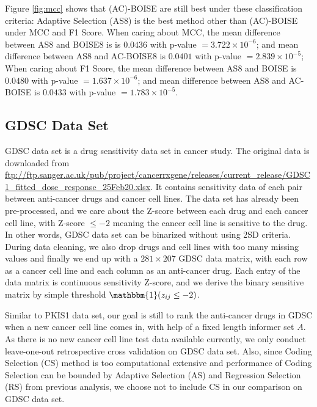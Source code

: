 \documentclass[12pt]{article}
\begin{document}
Figure \ref{fig:mcc} shows that (AC)-BOISE are still best under these classification criteria: Adaptive Selection (AS8) is the best method other than (AC)-BOISE  under MCC and F1 Score. When caring about MCC, the mean difference between AS8 and BOISE8 is is $0.0436$ with p-value $=3.722\times 10^{-6}$; and  mean difference between AS8 and AC-BOISE8 is $0.0401$ with p-value $=2.839\times 10^{-5}$; When caring about F1 Score, the mean difference between AS8 and BOISE is $0.0480$ with p-value $=1.637\times 10^{-6}$; and  mean difference between AS8 and AC-BOISE is $0.0433$ with p-value $=1.783\times 10^{-5}$.


\subsection{GDSC Data Set}
GDSC data set is a drug sensitivity data set in cancer study. The original data is downloaded from \url{ftp://ftp.sanger.ac.uk/pub/project/cancerrxgene/releases/current_release/GDSC1_fitted_dose_response_25Feb20.xlsx}. It contains sensitivity data of each pair between anti-cancer drugs and cancer cell lines. The data set has already been pre-processed, and we care about the Z-score between each drug and each cancer cell line, with Z-score $\leq -2$ meaning the cancer cell line is sensitive to the drug. In other words, GDSC data set can be binarized without using 2SD criteria. During data cleaning, we also drop drugs and cell lines with too many missing values and finally we end up with a $281\times 207$ GDSC data matrix, with each row as a cancer cell line and each column as an anti-cancer drug. Each entry of the data matrix is continuous sensitivity Z-score, and we derive the binary sensitive matrix by simple threshold $\mathbbm{1}(z_{ij}\leq -2)$. 

Similar to PKIS1 data set, our goal is still to rank the anti-cancer drugs in GDSC when a new cancer cell line comes in, with help of a fixed length informer set $A$. As there is no new cancer cell line test data available currently, we only conduct leave-one-out retrospective cross validation on GDSC data set. Also, since Coding Selection (CS) method is too computational extensive and  performance of Coding Selection can be bounded by Adaptive Selection (AS) and Regression Selection (RS) from previous analysis, we choose not to include CS in our comparison on GDSC data set. 
\end{document}
